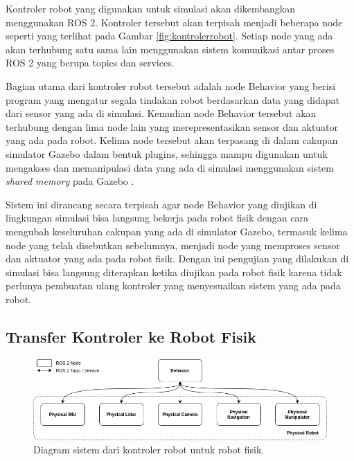 Kontroler robot yang digunakan untuk simulasi akan dikembangkan menggunakan ROS 2.
Kontroler tersebut akan terpisah menjadi beberapa node seperti yang terlihat pada Gambar \ref{fig:kontrolerrobot}.
Setiap node yang ada akan terhubung satu sama lain menggunakan sistem komunikasi antar proses ROS 2 yang berupa topics dan services.

Bagian utama dari kontroler robot tersebut adalah node Behavior yang berisi program yang mengatur segala tindakan robot berdasarkan data yang didapat dari sensor yang ada di simulasi.
Kemudian node Behavior tersebut akan terhubung dengan lima node lain yang merepresentasikan sensor dan aktuator yang ada pada robot.
Kelima node tersebut akan terpasang di dalam cakupan simulator Gazebo dalam bentuk plugins, sehingga mampu digunakan untuk mengakses dan memanipulasi data yang ada di simulasi menggunakan sistem \emph{shared memory} pada Gazebo \citep{gazeboplugins}.

Sistem ini dirancang secara terpisah agar node Behavior yang diujikan di lingkungan simulasi bisa langsung bekerja pada robot fisik dengan cara mengubah keseluruhan cakupan yang ada di simulator Gazebo, termasuk kelima node yang telah disebutkan sebelumnya, menjadi node yang memproses sensor dan aktuator yang ada pada robot fisik.
Dengan ini pengujian yang dilakukan di simulasi bisa langsung diterapkan ketika diujikan pada robot fisik karena tidak perlunya pembuatan ulang kontroler yang menyesuaikan sistem yang ada pada robot.

\subsection{Transfer Kontroler ke Robot Fisik}

\begin{figure} [ht] \centering
  \includegraphics[scale=0.5]{gambar/transferkontroler.png}
  \caption{Diagram sistem dari kontroler robot untuk robot fisik.}
  \label{fig:transferkontroler}
\end{figure}

